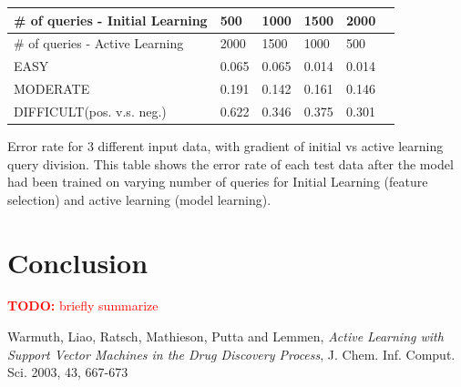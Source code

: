 \documentclass[paper=a4, fontsize=11pt]{scrartcl}
\numberwithin{equation}{section}    %
\numberwithin{figure}{section}      %
\numberwithin{table}{section}       %
\newcommand{\TODO}[1]{\textcolor{red}{\textbf{TODO: } #1}}
\numberwithin{equation}{section}    %
\numberwithin{figure}{section}      %
\numberwithin{table}{section}       %
\begin{document}
\begin{minipage}{\linewidth}
\smallskip
\centering
{} \label{errortable} 
\begin{tabular}{ p{2in} C{.85in} *4{C{.7in}}}\toprule[1.5pt]
\# of queries - Initial Learning & 500 & 1000 & 1500 & 2000  \\ \toprule[1.5pt]
\# of queries - Active Learning & 2000 & 1500 & 1000 & 500  \\ \bottomrule[1.25pt]
EASY                          & 0.065                              & 0.065                               & 0.014                               & 0.014                               \\
MODERATE                      & 0.191                              & 0.142                               & 0.161                               & 0.146                               \\
DIFFICULT(pos. v.s. neg.)     & 0.622                              & 0.346                               & 0.375                               & 0.301                               \\
\bottomrule[1.25pt]
\end{tabular} \par \bigskip 
Error rate for 3 different input data, with gradient of initial vs active learning query division.
This table shows the error rate of each test data after the model had been trained on varying number of queries for Initial Learning (feature selection) and active learning (model learning). 
\end{minipage}
\FloatBarrier



\section{Conclusion}

\TODO{briefly summarize}


\begin{thebibliography}{1}




Warmuth, Liao, Ratsch, Mathieson, Putta and Lemmen, \emph{Active Learning with Support Vector Machines in the Drug Discovery Process}, J. Chem. Inf. Comput. Sci. 2003, 43, 667-673

\end{thebibliography}
\end{document}
